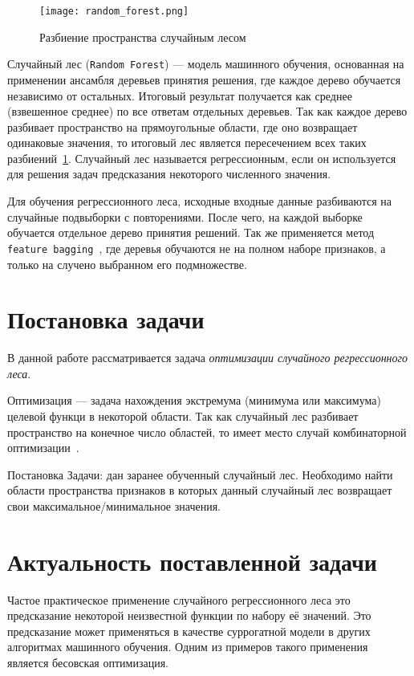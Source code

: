 \begin{figure}[ht!]
\caption{Разбиение пространства случайным лесом}\label{random_forest}
\texttt{[image: random\_forest.png]}
\end{figure}

Случайный лес (\texttt{Random Forest}\cite{randomforest}) --- модель машинного
обучения, основанная на применении ансамбля деревьев принятия решения, где
каждое дерево обучается независимо от остальных. Итоговый результат получается
как среднее (взвешенное среднее) по все ответам отдельных деревьев. Так как
каждое дерево разбивает пространство на прямоугольные области, где оно
возвращает одинаковые значения, то итоговый лес является пересечением всех таких
разбиений~\cref{random_forest}. Случайный лес называется регрессионным, если он
используется для решения задач предсказания некоторого численного значения.

Для обучения регрессионного леса, исходные входные данные разбиваются на случайные
подвыборки с повторениями. После чего, на каждой выборке обучается отдельное
дерево принятия решений. Так же применяется метод \texttt{feature
bagging}~\cite{bagging}, где деревья обучаются не на полном наборе признаков,
а только на случено выбранном его подмножестве.

\section{Постановка задачи}

В данной работе рассматривается задача \emph{оптимизации случайного
регрессионного леса}.

Оптимизация --- задача нахождения экстремума (минимума или максимума) целевой
функци в некоторой области. Так как случайный лес разбивает пространство на
конечное число областей, то имеет место случай комбинаторной
оптимизации~\cite{optimize}.

Постановка Задачи: дан заранее обученный случайный лес. Необходимо найти области
пространства признаков в которых данный случайный лес возвращает свои
максимальное/минимальное значения.

\section{Актуальность поставленной задачи}

Частое практическое применение случайного регрессионного леса это  предсказание
некоторой неизвестной функции по набору её значений. Это предсказание может
применяться в качестве суррогатной модели в других алгоритмах машинного
обучения. Одним из примеров такого применения является бесовская оптимизация.

